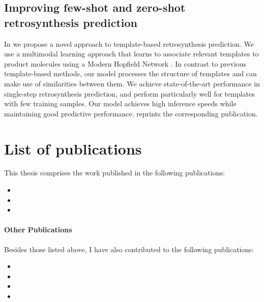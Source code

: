 \subsection{Improving few-shot and zero-shot retrosynthesis prediction}
In \citep{seidlImprovingFewZeroShot2022} we propose a novel approach to template-based
retrosynthesis prediction. We use a multimodal learning approach that learns to associate relevant
templates to product molecules using a Modern Hopfield Network
\citep{ramsauerHopfieldNetworksAll2020}. In contrast to previous template-based methods, our model
processes the structure of templates and can make use of similarities between them. We achieve
state-of-the-art performance in single-step retrosynthesis prediction, and perform particularly well
for templates with few training samples. Our model achieves high inference speeds while maintaining
good predictive performance.  reprints the corresponding publication.

\section{List of publications\label{sec:publications}} This thesis comprises the work published in
the following publications:

\begin{itemize}
    \item {}
    \item {}
    \item {}
\end{itemize}

\paragraph{Other Publications} Besides those listed above, I have also contributed to the
following publications:

\begin{itemize}
    \item {}
    \item {}
    \item {}
    \item {}
\end{itemize}